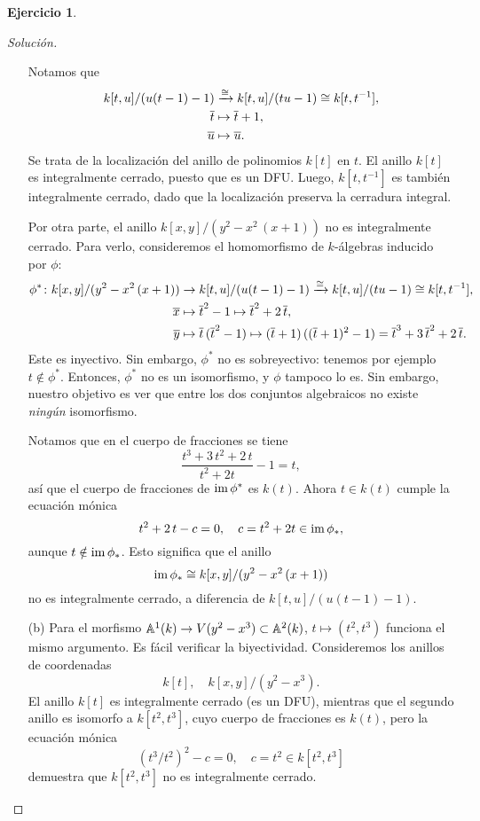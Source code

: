 \documentclass{article}
\theoremstyle{definition}
\newtheorem{ejerc}{Ejercicio}
\newenvironment{solucion}{\begin{proof}[Solución]}{\end{proof}}
\begin{document}
\begin{ejerc}
\begin{solucion}
\begin{enumerate}
      Notamos que
      \begin{align*}
        k [t,u] / (u(t-1)-1) & \xrightarrow{\isom} k [t,u]/(tu-1) \isom k [t,t^{-1}],\\
        \overline{t} & \mapsto \overline{t}+1,\\
        \overline{u} & \mapsto \overline{u}.
      \end{align*}
      Se trata de la localización del anillo de polinomios $k [t]$ en $t$.
      El anillo $k [t]$ es integralmente cerrado, puesto que es un DFU. Luego,
      $k [t,t^{-1}]$ es también integralmente cerrado, dado que la localización
      preserva la cerradura integral.

      Por otra parte, el anillo $k [x,y] / (y^2 - x^2\,(x+1))$ no es
      integralmente cerrado. Para verlo, consideremos el homomorfismo de
      $k$-álgebras inducido por $\phi$:
      \begin{align*}
        \phi^*\colon k [x,y] / (y^2 - x^2\,(x+1)) & \to k [t,u] / (u(t-1)-1) \xrightarrow{\isom} k [t,u]/(tu-1) \isom k [t,t^{-1}],\\
        \overline{x} & \mapsto \overline{t}^2 - 1 \mapsto \overline{t}^2 + 2\,\overline{t},\\
        \overline{y} & \mapsto \overline{t}\,(\overline{t}^2 - 1) \mapsto (\overline{t}+1)\,((\overline{t}+1)^2-1) = \overline{t}^3 + 3\,\overline{t}^2 + 2\,\overline{t}.
      \end{align*}
      Este es inyectivo. Sin embargo, $\phi^*$ no es sobreyectivo: tenemos por
      ejemplo $t \notin \phi^*$. Entonces, $\phi^*$ no es un isomorfismo, y
      $\phi$ tampoco lo es. Sin embargo, nuestro objetivo es ver que entre los
      dos conjuntos algebraicos no existe \emph{ningún} isomorfismo.

      Notamos que en el cuerpo de fracciones se tiene
      $$\frac{t^3 + 3\,t^2 + 2\,t}{t^2 + 2t} - 1 = t,$$
      así que el cuerpo de fracciones de $\im \phi^*$ es $k (t)$. Ahora
      $t \in k (t)$ cumple la ecuación mónica
      $$t^2 + 2\,t - c = 0, \quad c = t^2 + 2t \in \im \phi_*,$$
      aunque $t \notin \im \phi_*$. Esto significa que el anillo
      $$\im \phi_* \isom k [x,y] / (y^2 - x^2\,(x+1))$$
      no es integralmente cerrado, a diferencia de $k [t,u] / (u(t-1) - 1)$.

    \item[(b)] Para el morfismo $\AA^1 (k) \to V (y^2 - x^3) \subset \AA^2 (k)$,
      $t \mapsto (t^2, t^3)$ funciona el mismo argumento. Es fácil verificar la
      biyectividad. Consideremos los anillos de coordenadas
      $$k [t], \quad k [x,y] / (y^2 - x^3).$$
      El anillo $k [t]$ es integralmente cerrado (es un DFU), mientras que el
      segundo anillo es isomorfo a $k [t^2,t^3]$, cuyo cuerpo de fracciones es
      $k (t)$, pero la ecuación mónica
      $$(t^3/t^2)^2 - c = 0, \quad c = t^2 \in k [t^2,t^3]$$
      demuestra que $k [t^2,t^3]$ no es integralmente cerrado.
    \end{enumerate}


\end{solucion}
\end{ejerc}
\end{document}
